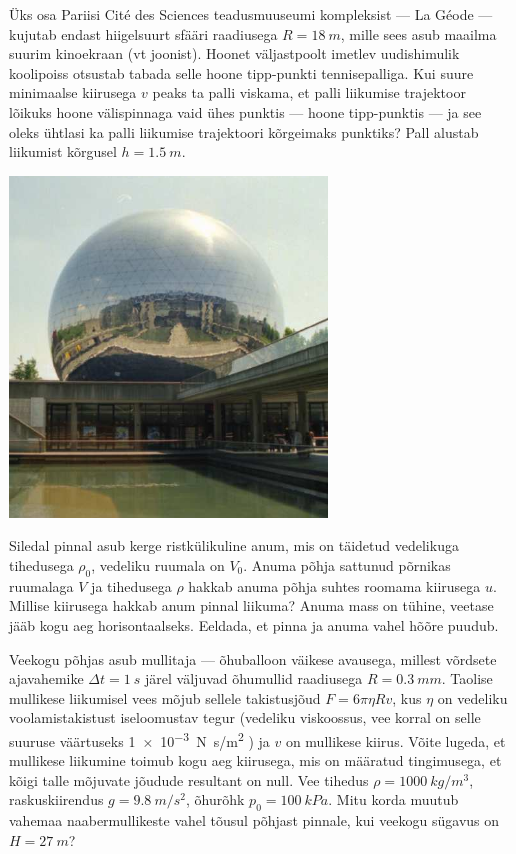 \documentclass[10pt, twoside]{article}
\begin{document}
{
Üks osa Pariisi Cité des Sciences teadusmuuseumi kompleksist --- La Géode --- kujutab endast hiigelsuurt sfääri raadiusega $R = \SI{18}{m}$, mille sees asub maailma suurim kinoekraan (vt joonist). Hoonet väljastpoolt imetlev uudishimulik koolipoiss otsustab tabada selle hoone tipp-punkti tennisepalliga. Kui suure minimaalse kiirusega $v$ peaks ta palli viskama, et palli liikumise trajektoor lõikuks hoone välispinnaga vaid ühes punktis --- hoone tipp-punktis --- ja see oleks ühtlasi ka palli liikumise trajektoori kõrgeimaks punktiks? Pall alustab liikumist kõrgusel $h = \SI{1,5}{m}$.

\begin{center}
	\includegraphics[width=0.5\linewidth]{2005-lahg-06-yl}
\end{center}
\probend
\bigskip


Siledal pinnal asub kerge ristkülikuline anum, mis on täidetud vedelikuga tihedusega $\rho_0$, vedeliku ruumala on $V_0$. Anuma põhja sattunud põrnikas ruumalaga $V$ ja tihedusega $\rho$ hakkab anuma põhja suhtes roomama kiirusega $u$. Millise kiirusega hakkab anum pinnal liikuma? Anuma mass on tühine, veetase jääb kogu aeg horisontaalseks. Eeldada, et pinna ja anuma vahel hõõre puudub.
\probend
\bigskip


Veekogu põhjas asub mullitaja --- õhuballoon väikese avausega, millest võrdsete ajavahemike $\Delta t = \SI{1}{s}$ järel väljuvad õhumullid raadiusega $R = \SI{0,3}{mm}$. Taolise mullikese liikumisel vees mõjub sellele takistusjõud $F = 6\pi \eta Rv$, kus $\eta$ on vedeliku voolamistakistust iseloomustav tegur (vedeliku viskoossus, vee korral on selle suuruse väärtuseks \SI{1e-3}{N.s/m^2} ) ja $v$ on mullikese kiirus. Võite lugeda, et mullikese liikumine toimub kogu aeg kiirusega, mis on määratud tingimusega, et kõigi talle mõjuvate jõudude resultant on null. Vee tihedus $\rho = \SI{1000}{kg/m^3}$, raskuskiirendus $g = \SI{9,8}{m/s^2}$, õhurõhk $p_0 = \SI{100}{kPa}$. Mitu korda muutub vahemaa naabermullikeste vahel tõusul põhjast pinnale, kui veekogu sügavus on $H = \SI{27}{m}$?
\probend
\bigskip

}
\end{document}

